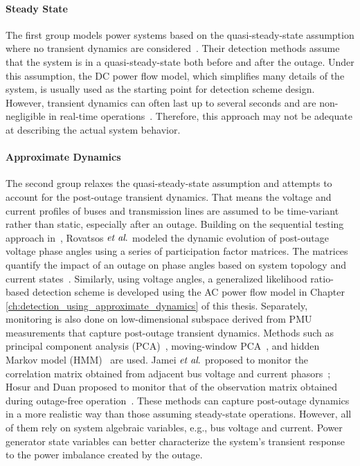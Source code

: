 \paragraph{Steady State}
The first group models power systems based on the quasi-steady-state assumption where no transient dynamics are considered~\cite{Tate2008, tate2009double, babakmehr2015application,Chen2016, ardakanian2017event,Ardakanian2019a}. Their detection methods assume that the system is in a quasi-steady-state both before and after the outage. Under this assumption, the DC power flow model, which simplifies many details of the system, is usually used as the starting point for detection scheme design. However, transient dynamics can often last up to several seconds and are non-negligible in real-time operations~\cite{Glover2012}. Therefore, this approach may not be adequate at describing the actual system behavior. 

\paragraph{Approximate Dynamics}
The second group relaxes the quasi-steady-state assumption and attempts to account for the post-outage transient dynamics. That means the voltage and current profiles of buses and transmission lines are assumed to be time-variant rather than static, especially after an outage.
Building on the sequential testing approach in~\cite{Chen2016}, Rovatsos $\textit{et al}.$ modeled the dynamic evolution of post-outage voltage phase angles using a series of participation factor matrices. The matrices quantify the impact of an outage on phase angles based on system topology and current states~\cite{Rovatsos2017}. 
Similarly, using voltage angles, a generalized likelihood ratio-based detection scheme is developed using the AC power flow model in Chapter \ref{ch:detection_using_approximate_dynamics} of this thesis. 
Separately, monitoring is also done on low-dimensional subspace derived from PMU measurements that capture post-outage transient dynamics. Methods such as principal component analysis (PCA)~\cite{Xie2014}, moving-window PCA~\cite{Rafferty2016}, and hidden Markov model (HMM)~\cite{Huang2016b} are used. Jamei $\textit{et al}.$ proposed to monitor the correlation matrix obtained from adjacent bus voltage and current phasors~\cite{Jamei2017a}; Hosur and Duan proposed to monitor that of the observation matrix obtained during outage-free operation~\cite{Hosur2019}. These methods can capture post-outage dynamics in a more realistic way than those assuming steady-state operations. However, all of them rely on system algebraic variables, e.g., bus voltage and current. Power generator state variables can better characterize the system's transient response to the power imbalance created by the outage.


